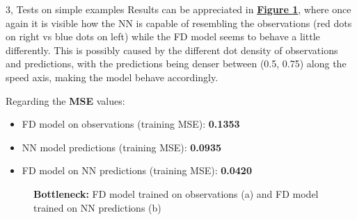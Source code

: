 \documentclass[10pt,a4paper]{article}
\begin{document}
\begin{task}{3, Tests on simple examples}
Results can be appreciated in \textbf{\hyperref[fig:vadere-bottleneck-result]{Figure \ref{fig:vadere-bottleneck-result}}}, where once again it is visible how the NN is capable of resembling the observations (red dots on right vs blue dots on left) while the FD model seems to behave a little differently. This is possibly caused by the different dot density of observations and predictions, with the predictions being denser between (0.5, 0.75) along the speed axis, making the model behave accordingly.

Regarding the \textbf{MSE} values:
\begin{itemize}
    \item FD model on observations (training MSE): \textbf{0.1353}
    \item NN model predictions (training MSE): \textbf{0.0935}
    \item FD model on NN predictions (training MSE): \textbf{0.0420}
\end{itemize}

\begin{figure}[h]
    \centering
    \hfill
    \caption{\textbf{Bottleneck: }FD model trained on observations (a) and FD model trained on NN predictions (b)}
    \label{fig:vadere-bottleneck-result}
\end{figure}


\end{task}
\end{document}
